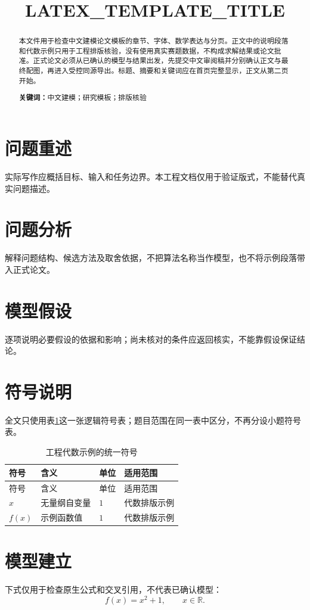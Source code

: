 \documentclass[UTF8,fontset=none,12pt,a4paper]{ctexart}
\title{LATEX_TEMPLATE_TITLE}
\author{}
\date{}
\newcommand{\keywords}[1]{\par\noindent\textbf{关键词：}#1}
\begin{document}
\hypersetup{pageanchor=false}
\maketitle
\thispagestyle{empty}
\begin{abstract}
本文件用于检查中文建模论文模板的章节、字体、数学表达与分页。正文中的说明段落和代数示例只用于工程排版核验，没有使用真实赛题数据，不构成求解结果或论文批准。正式论文必须从已确认的模型与结果出发，先提交中文审阅稿并分别确认正文与最终配图，再进入受控同源导出。标题、摘要和关键词应在首页完整显示，正文从第二页开始。
\keywords{中文建模；研究模板；排版核验}
\end{abstract}
\clearpage
{}
\hypersetup{pageanchor=true}
\section{问题重述}
实际写作应概括目标、输入和任务边界。本工程文档仅用于验证版式，不能替代真实问题描述。
\section{问题分析}
解释问题结构、候选方法及取舍依据，不把算法名称当作模型，也不将示例段落带入正式论文。
\section{模型假设}
逐项说明必要假设的依据和影响；尚未核对的条件应返回核实，不能靠假设保证结论。
\section{符号说明}
全文只使用表\ref{tab:symbols}这一张逻辑符号表；题目范围在同一表中区分，不再分设小题符号表。
\begin{longtable}{llll}
\caption{工程代数示例的统一符号}\label{tab:symbols}\\
\toprule
符号 & 含义 & 单位 & 适用范围 \\
\midrule
\endfirsthead
\toprule
符号 & 含义 & 单位 & 适用范围 \\
\midrule
\endhead
$x$ & 无量纲自变量 & $1$ & 代数排版示例 \\
$f(x)$ & 示例函数值 & $1$ & 代数排版示例 \\
\bottomrule
\end{longtable}
\section{模型建立}
下式仅用于检查原生公式和交叉引用，不代表已确认模型：
\begin{equation}\label{eq:example}
f(x)=x^2+1,\qquad x\in\mathbb{R}.
\end{equation}
\end{document}
